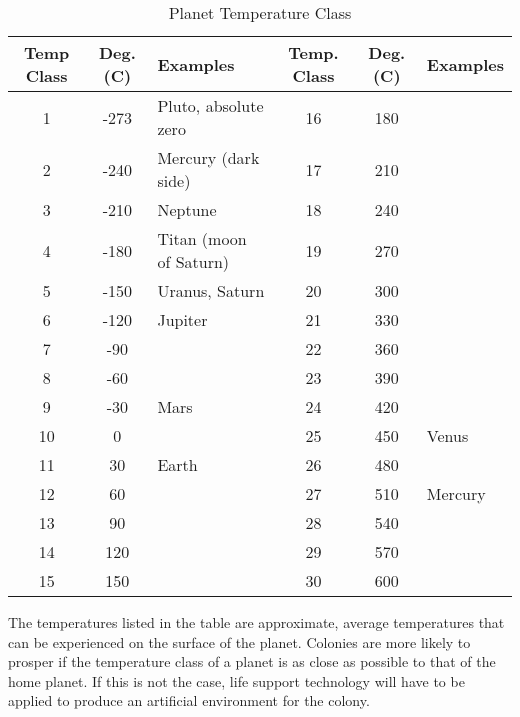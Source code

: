 \documentclass[10pt,titlepage]{article}
\begin{document}
\begin{table}[h]
\begin{center}
\begin{tabular}{|ccl|ccl|}
\hline
\rowcolor{lightblue} \textbf{Temp Class} & \textbf{Deg. (C)} & \textbf{Examples} & \textbf{Temp. Class} & \textbf{Deg. (C)} & \textbf{Examples} \\
\hline
    1 &    -273 &  Pluto, absolute zero   &   16 &     180 & \\
    2 &    -240 &  Mercury (dark side)    &    17 &     210 & \\
    3 &    -210 &  Neptune                &   18 &     240 & \\
    4 &    -180 &  Titan (moon of Saturn) & 19 &    270 & \\
    5 &    -150 &  Uranus, Saturn         &   20 &     300 & \\
    6 &    -120 &  Jupiter                &   21 &     330 & \\
    7 &     -90 &                         &   22 &     360 & \\
    8 &     -60 &                         &   23 &     390 & \\
    9 &     -30 &  Mars                   &   24 &     420 & \\
   10 &       0 &                         &  25 &     450 &  Venus \\
   11 &      30 &  Earth                  &   26 &     480 & \\
   12 &      60 &                         &   27 &     510 &  Mercury \\
   13 &      90 &                         &   28 &     540 & \\
   14 &     120 &                         &   29 &     570 & \\
   15 &     150 &                         &   30 &     600 & \\
\hline
\end{tabular}
\caption{Planet Temperature Class}
\label{tab:temp}
\end{center}
\end{table}

The temperatures listed in the table are approximate, average temperatures that
can be experienced on the surface of the planet.  Colonies are more likely to
prosper if the temperature class of a planet is as close as possible to that of
the home planet.  If this is not the case, life support technology will have to
be applied to produce an artificial environment for the colony.
\end{document}
